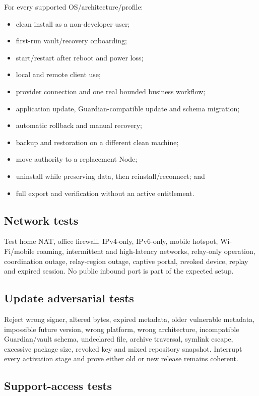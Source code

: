 \documentclass[11pt]{article}
\begin{document}
For every supported OS/architecture/profile:

\begin{itemize}
  \item clean install as a non-developer user;
  \item first-run vault/recovery onboarding;
  \item start/restart after reboot and power loss;
  \item local and remote client use;
  \item provider connection and one real bounded business workflow;
  \item application update, Guardian-compatible update and schema migration;
  \item automatic rollback and manual recovery;
  \item backup and restoration on a different clean machine;
  \item move authority to a replacement Node;
  \item uninstall while preserving data, then reinstall/reconnect; and
  \item full export and verification without an active entitlement.
\end{itemize}

\subsection{Network tests}

Test home NAT, office firewall, IPv4-only, IPv6-only, mobile hotspot, Wi-Fi/mobile roaming, intermittent and high-latency networks, relay-only operation, coordination outage, relay-region outage, captive portal, revoked device, replay and expired session. No public inbound port is part of the expected setup.

\subsection{Update adversarial tests}

Reject wrong signer, altered bytes, expired metadata, older vulnerable metadata, impossible future version, wrong platform, wrong architecture, incompatible Guardian/vault schema, undeclared file, archive traversal, symlink escape, excessive package size, revoked key and mixed repository snapshot. Interrupt every activation stage and prove either old or new release remains coherent.

\subsection{Support-access tests}
\end{document}
